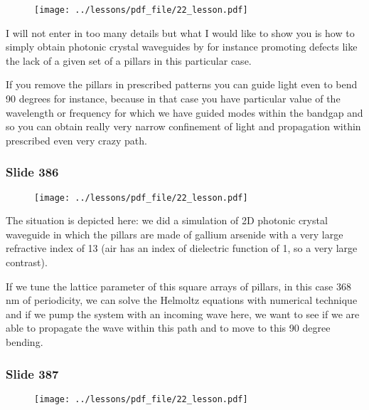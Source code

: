 \documentclass[../main/main.tex]{subfiles}
\begin{document}
\begin{figure}[h!]
\centering
\texttt{[image: ../lessons/pdf\_file/22\_lesson.pdf]}
\end{figure}

I will not enter in too many details but what I would like to show you is how to simply obtain photonic crystal waveguides by for instance promoting defects like the lack of a given set of a pillars in this particular case. 

If you remove the pillars in prescribed patterns you can guide light even to bend 90 degrees for instance, because in that case you have particular value of the wavelength or frequency for which we have guided modes within the bandgap and so you can obtain really very narrow confinement of light and propagation within prescribed even very crazy path.

\newpage

\subsubsection{Slide 386}

\begin{figure}[h!]
\centering
\texttt{[image: ../lessons/pdf\_file/22\_lesson.pdf]}
\end{figure}

The situation is depicted here: we did a simulation of 2D photonic crystal waveguide in which the pillars are made of gallium arsenide with a very large refractive index of 13 (air has an index of dielectric function of 1, so a very large contrast). 

If we tune the lattice parameter of this square arrays of pillars, in this case 368 nm of periodicity, we can solve the Helmoltz equations with numerical technique and if we pump the system with an incoming wave here, we want to see if we are able to propagate the wave within this path and to move to this 90 degree bending. 

\newpage

\subsubsection{Slide 387}

\begin{figure}[h!]
\centering
\texttt{[image: ../lessons/pdf\_file/22\_lesson.pdf]}
\end{figure}
\end{document}
